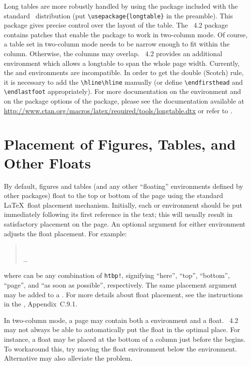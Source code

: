 \documentclass[%
,aps%
 ,twocolumn%
 ,secnumarabic%
,amssymb, amsmath,nobibnotes, aps, prl, floatfix]{revtex4-2}
\begin{document}
Long tables are more robustly handled by using the
 package included with the standard \LaTeXe\
distribution (put \verb+\usepackage{longtable}+ in the preamble). This
package gives precise control over the layout of the table.
The \revtex~4.2 package contains patches that enable the
 package to work in two-column mode. Of course, a
table set in two-column mode needs to be narrow enough to fit within
the column. Otherwise, the columns may overlap. \revtex~4.2 provides
an additional environment  which allows a longtable to
span the whole page width. Currently, the \env{longtable*} and
 environments are incompatible. In order to get the
double (Scotch) rule, it is necessary to add the \verb+\hline\hline+
manually (or define \verb+\endfirsthead+ and \verb+\endlastfoot+
appropriately).  For more documentation on the \env{longtable}
environment and on the package options of the
 package, please see the documentation available at
\url{http://www.ctan.org/macros/latex/required/tools/longtable.dtx} or
refer to \cite{Compan}.

\section{Placement of Figures, Tables, and Other Floats}
\label{sec:place}

By default, figures and tables (and any other ``floating'' environments
defined by other packages) float to the top or bottom of the page
using the standard \LaTeX\ float placement mechanism.  Initially, each
\env{figure} or \env{table} environment should be put immediately
following its first reference in the text; this will usually result in
satisfactory placement on the page.  An optional argument for either 
environment adjusts the float placement. For example:
\begin{quote}
\\
\dots\\
\end{quote}
where  can be any combination of \verb|htbp!|, signifying
``here'', ``top'', ``bottom'', ``page'', and ``as soon as possible'',
respectively. The same placement argument may be added to a
. For more details about float placement, 
see the instructions in the \LUG, Appendix~C.9.1.

In two-column mode, a page may contain both a 
environment and a float. \revtex~4.2 may not always be able to
automatically put the float in the optimal place. For instance, a
float may be placed at the bottom of a column just before the
 begins. To workaround this, try moving the float
environment below the \env{widetext} environment. Alternative
 may also alleviate the problem.
\end{document}
